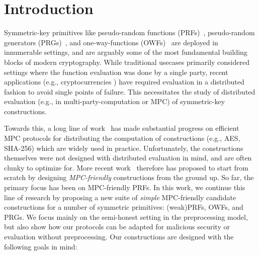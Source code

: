 
\section{Introduction}
\label{sec:introduction}



\medskip

Symmetric-key primitives like pseudo-random functions (PRFs)~\cite{goldreich1984-prf}, pseudo-random generators (PRGs)~\cite{?}, and one-way-functions (OWFs)~\cite{?} are deployed in innumerable settings, and are arguably some of the most fundamental building blocks of modern cryptography. While traditional usecases primarily considered settings where the function evaluation was done by a single party, recent applications (e.g., cryptocurrencies ) have required evaluation in a distributed fashion to avoid single points of failure. This necessitates the study of distributed evaluation (e.g., in multi-party-computation or MPC) of symmetric-key constructions. 

Towards this, a long line of work~\cite{damgard2010-aes, pinkas2009-aes, wang2017-mpc} has made substantial progress on efficient MPC protocols for distributing the computation of constructions (e.g., AES, SHA-256) which are widely used in practice. Unfortunately, the constructions themselves were not designed with distributed evaluation in mind, and are often clunky to optimize for. More recent work~\cite{albrecht2015-lowmc, grassi2016-mpcfriendly, boneh2018-darkmatter} therefore has proposed to start from scratch by designing \textit{MPC-friendly} constructions from the ground up. So far, the primary focus has been on MPC-friendly PRFs. In this work, we continue this line of research by proposing a new suite of \textit{simple} MPC-friendly candidate constructions for a number of symmetric primitives: (weak)PRFs, OWFs, and PRGs. We focus mainly on the semi-honest setting in the preprocessing model, but also show how our protocols can be adapted for malicious security or evaluation without preprocessing. Our constructions are designed with the following goals in mind:

